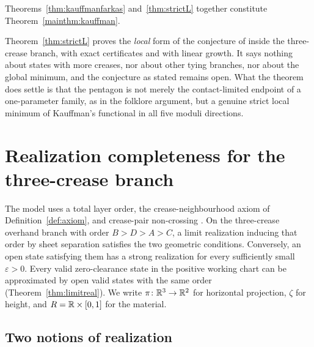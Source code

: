 Theorems~\ref{thm:kauffmanfarkas} and~\ref{thm:strictL} together constitute Theorem~\ref{mainthm:kauffman}.

\begin{remark}\label{rem:kauffmanstatus}
Theorem~\ref{thm:strictL} proves the \emph{local} form of the conjecture of \cite{kauffman2004} inside the three-crease branch, with exact certificates and with linear growth. It says nothing about states with more creases, nor about other tying branches, nor about the global minimum, and the conjecture as stated remains open. What the theorem does settle is that the pentagon is not merely the contact-limited endpoint of a one-parameter family, as in the folklore argument, but a genuine strict local minimum of Kauffman's functional in all five moduli directions.
\end{remark}

\section{Realization completeness for the three-crease branch}\label{sec:realization}

The model uses a total layer order, the crease-neighbourhood axiom of Definition~\ref{def:axiom}, and crease-pair non-crossing \cite{justin1997,hull2002,demaine2007}. On the three-crease overhand branch with order $B>D>A>C$, a limit realization inducing that order by sheet separation satisfies the two geometric conditions. Conversely, an open state satisfying them has a strong realization for every sufficiently small $\varepsilon>0$. Every valid zero-clearance state in the positive working chart can be approximated by open valid states with the same order (Theorem~\ref{thm:limitreal}). We write $\pi\colon\mathbb{R}^3\to\mathbb{R}^2$ for horizontal projection, $\zeta$ for height, and $R=\mathbb{R}\times[0,1]$ for the material.

\subsection{Two notions of realization}

